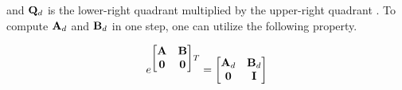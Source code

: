and $\mathbf{Q}_d$ is the lower-right quadrant multiplied by the upper-right
quadrant \cite{bib:integral_matrix_exp}. To compute $\mathbf{A}_d$ and $\mathbf{B}_d$
in one step, one can utilize the following property.

\begin{equation*}
  e^{
  \begin{bmatrix}
    \mathbf{A} & \mathbf{B} \\
    \mathbf{0} & \mathbf{0}
  \end{bmatrix}T} =
  \begin{bmatrix}
    \mathbf{A}_d & \mathbf{B}_d \\
    \mathbf{0} & \mathbf{I}
  \end{bmatrix}
\end{equation*}
